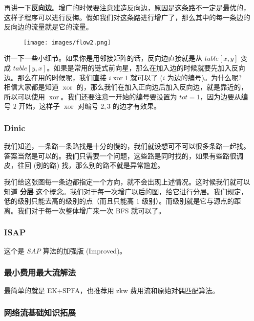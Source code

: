 再讲一下\textbf{反向边}。增广的时候要注意建造反向边，原因是这条路不一定是最优的，这样子程序可以进行反悔。假如我们对这条路进行增广了，那么其中的每一条边的反向边的流量就是它的流量。

\begin{figure}[h]
\centering
\texttt{[image: images/flow2.png]} 

\end{figure}

讲一下一些小细节。如果你是用邻接矩阵的话，反向边直接就是从 $table[x,y]$ 变成 $table[y,x]$。如果是常用的链式前向星，那么在加入边的时候就要先加入反向边。那么在用的时候呢，我们直接 $i\operatorname{xor}1$ 就可以了 ($i$ 为边的编号)。为什么呢? 相信大家都是知道 $\operatorname{xor}$ 的，那么我们在加入正向边后加入反向边，就是靠近的，所以可以使用 $\operatorname{xor}$。我们还要注意一开始的编号要设置为 $tot=1$，因为边要从编号 $2$ 开始，这样子 $\operatorname{xor}$ 对编号 $2,3$ 的边才有效果。

\subsubsection{Dinic}

我们知道，一条路一条路找是十分的慢的，我们就设想可不可以很多条路一起找。答案当然是可以的。我们只需要一个问题，这些路是同时找的，如果有些路很调皮，往回 (别的路) 找，那么别的路不就是异常尴尬。

我们给这张图每一条边都指定一个方向，就不会出现上述情况。这时候我们就可以知道 \textbf{分层} 这个概念。我们对于每一次增广以后的图，给它进行分层。我们规定，低的级别只能去高的级别的点（而且只能高 $1$ 级别）。而级别就是它与源点的距离。我们对于每一次整体增广来一次 BFS 就可以了。

\subsubsection{ISAP}

这个是 $SAP$ 算法的加强版 (Improved)。

\subsubsection{最小费用最大流解法}

最简单的就是 EK+SPFA，也推荐用 zkw 费用流和原始对偶匹配算法。

\subsubsection{网络流基础知识拓展}


